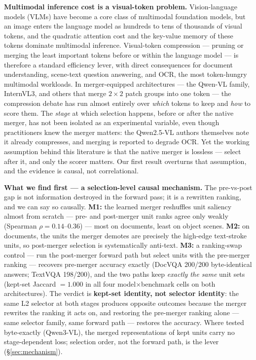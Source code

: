 \documentclass[sigconf,review,anonymous]{acmart}
\begin{document}
\textbf{Multimodal inference cost is a visual-token problem.} Vision-language
models (VLMs) have become a core class of multimodal foundation models, but an
image enters the language model as hundreds to tens of thousands of visual
tokens, and the quadratic attention cost and the key-value memory of these
tokens dominate multimodal inference. Visual-token compression --- pruning or
merging the least important tokens before or within the language model --- is
therefore a standard efficiency lever, with direct consequences for document
understanding, scene-text question answering, and OCR, the most token-hungry
multimodal workloads. In merger-equipped architectures --- the Qwen-VL family,
InternVL3, and others that merge $2\!\times\!2$ patch groups into one token ---
the compression debate has run almost entirely over \emph{which} tokens to keep
and \emph{how} to score them. The \emph{stage} at which selection happens,
before or after the native merger, has not been isolated as an experimental
variable, even though practitioners knew the merger matters: the Qwen2.5-VL
authors themselves note it already compresses, and merging is reported to
degrade OCR. Yet the working assumption behind this literature is that the
native merger is lossless --- select after it, and only the scorer matters.
Our first result overturns that assumption, and the evidence is causal, not
correlational.

\textbf{What we find first --- a selection-level causal mechanism.} The
pre-vs-post gap is not information destroyed in the forward pass; it is a
rewritten ranking, and we can say so causally. \textbf{M1:} the learned merger
reshuffles unit saliency almost from scratch --- pre- and post-merger unit
ranks agree only weakly (Spearman $\rho = 0.14$--$0.36$) --- most on documents,
least on object scenes. \textbf{M2:} on documents, the units the merger demotes
are precisely the high-edge text-stroke units, so post-merger selection is
systematically anti-text. \textbf{M3:} a ranking-swap control --- run the
post-merger forward path but select units with the pre-merger ranking ---
recovers pre-merger accuracy exactly (DocVQA 200/200 byte-identical answers;
TextVQA 198/200), and the two paths keep \emph{exactly the same} unit sets
(kept-set Jaccard $= 1.000$ in all four model$\times$benchmark cells on both
architectures). The verdict is \textbf{kept-set identity, not selector
identity}: the same L2 selector at both stages produces opposite outcomes
because the merger rewrites the ranking it acts on, and restoring the
pre-merger ranking alone --- same selector family, same forward path ---
restores the accuracy. Where tested byte-exactly (Qwen3-VL), the merged
representations of kept units carry no stage-dependent loss; selection order,
not the forward path, is the lever (\S\ref{sec:mechanism}).
\end{document}
